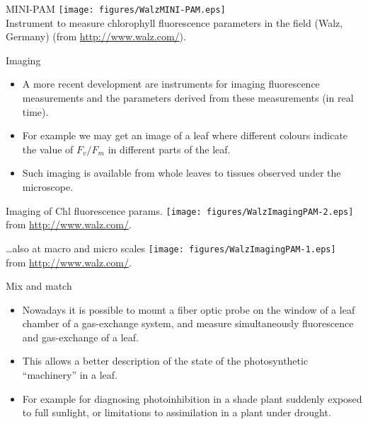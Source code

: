 \documentclass[10pt]{beamer}
\begin{document}
\begin{frame}{MINI-PAM}
    \centering
    \texttt{[image: figures/WalzMINI-PAM.eps]}\\
    {\small Instrument to measure chlorophyll fluorescence parameters
    in the field (Walz, Germany) (from \url{http://www.walz.com/}).}
\end{frame}

\begin{frame}{Imaging}
    \begin{itemize}
        \item A more recent development are instruments for
        imaging fluorescence measurements and the parameters derived
        from these measurements (in real time).
        \item For example we may get an image of a leaf where
        different colours indicate the value of $F_v/F_m$ in
        different parts of the leaf.
        \item Such imaging is available from whole leaves to
        tissues observed under the microscope.
    \end{itemize}
\end{frame}

\begin{frame}{Imaging of Chl fluorescence params.}
    \centering
    \texttt{[image: figures/WalzImagingPAM-2.eps]}\\
    {\small  from \url{http://www.walz.com/}.}
\end{frame}

\begin{frame}{\ldots also at macro and micro scales}
    \centering
    \texttt{[image: figures/WalzImagingPAM-1.eps]}\\
    {\small  from \url{http://www.walz.com/}.}
\end{frame}

\begin{frame}{Mix and match}
    \begin{itemize}
        \item Nowadays it is possible to mount a fiber optic probe
        on the window of a leaf chamber of a gas-exchange system,
        and measure simultaneously fluorescence and gas-exchange of
        a leaf.
        \item This allows a better description of the state of
        the photosynthetic ``machinery'' in a leaf.
        \item For example for diagnosing photoinhibition in a
        shade plant suddenly exposed to full sunlight, or
        limitations to assimilation in a plant under drought.
    \end{itemize}
\end{frame}
\end{document}
